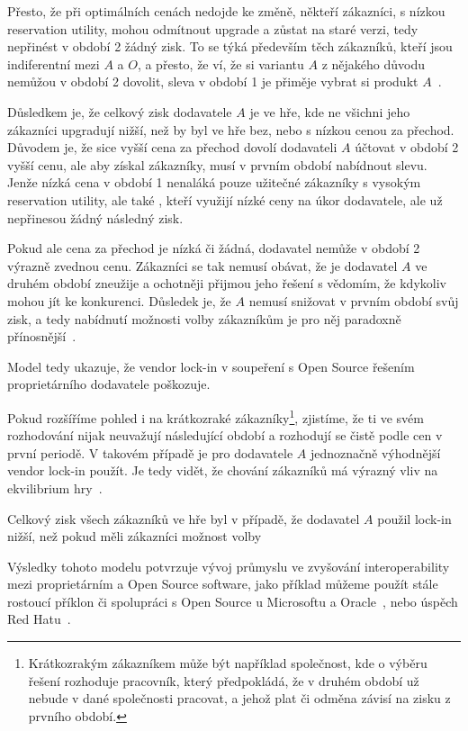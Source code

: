 \begin{multicols}{2}
	Přesto, že při optimálních cenách nedojde ke změně, někteří zákazníci, s nízkou reservation utility, mohou odmítnout upgrade a zůstat na staré verzi, tedy nepřinést v období 2 žádný zisk. To se týká především těch zákazníků, kteří jsou indiferentní mezi $A$ a $O$, a přesto, že ví, že si variantu $A$ z nějakého důvodu nemůžou v období 2 dovolit, sleva v období 1 je přiměje vybrat si produkt $A$~\cite[str. 6]{lock-in-competition}.

	Důsledkem je, že celkový zisk dodavatele $A$ je ve hře, kde ne všichni jeho zákazníci upgradují nižší, než by byl ve hře bez, nebo s nízkou cenou za přechod. Důvodem je, že sice vyšší cena za přechod dovolí dodavateli $A$ účtovat v období 2 vyšší cenu, ale aby získal zákazníky, musí v prvním období nabídnout slevu. Jenže nízká cena v období 1 nenaláká pouze užitečné zákazníky s vysokým reservation utility, ale také , kteří využijí nízké ceny na úkor dodavatele, ale už nepřinesou žádný následný zisk.

	Pokud ale cena za přechod je nízká či žádná, dodavatel nemůže v období 2 výrazně zvednou cenu. Zákazníci se tak nemusí obávat, že je dodavatel $A$ ve druhém období zneužije a ochotněji přijmou jeho řešení s vědomím, že kdykoliv mohou jít ke konkurenci. Důsledek je, že $A$ nemusí snižovat v prvním období svůj zisk, a tedy nabídnutí možnosti volby zákazníkům je pro něj paradoxně přínosnější~\cite[str. 7 a kap. 3: lemma 2]{lock-in-competition}.

	Model tedy ukazuje, že vendor lock-in v soupeření s Open Source řešením proprietárního dodavatele poškozuje.

	Pokud rozšíříme pohled i na krátkozraké zákazníky\footnote{Krátkozrakým zákazníkem může být například společnost, kde o výběru řešení rozhoduje pracovník, který předpokládá, že v druhém období už nebude v dané společnosti pracovat, a jehož plat či odměna závisí na zisku z prvního období.}, zjistíme, že ti ve svém rozhodování nijak neuvažují následující období a rozhodují se čistě podle cen v první periodě. V takovém případě je pro dodavatele $A$ jednoznačně výhodnější vendor lock-in použít. Je tedy vidět, že chování zákazníků má výrazný vliv na ekvilibrium hry~\cite[kap. 4]{lock-in-competition}.

	Celkový zisk všech zákazníků ve hře byl v případě, že dodavatel $A$ použil lock-in nižší, než pokud měli zákazníci možnost volby~\cite[kap. 5]{lock-in-competition}

	Výsledky tohoto modelu potvrzuje vývoj průmyslu ve zvyšování interoperability mezi proprietárním a Open Source software, jako příklad můžeme použít stále rostoucí příklon či spolupráci s Open Source u Microsoftu a Oracle~\cite[kap. 6]{lock-in-competition}, nebo úspěch Red Hatu~\cite{redhat-growth}.



\end{multicols}
